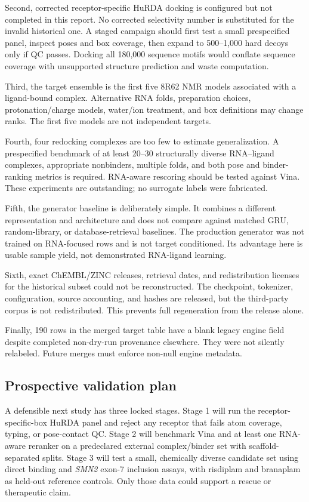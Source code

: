 \documentclass[journal]{IEEEtran}
\begin{document}
Second, corrected receptor-specific HuRDA docking is configured but not
completed in this report. No corrected selectivity number is substituted
for the invalid historical one. A staged campaign should first test a
small prespecified panel, inspect poses and box coverage, then expand to
500--1,000 hard decoys only if QC passes. Docking all 180,000 sequence
motifs would conflate sequence coverage with unsupported structure
prediction and waste computation.

Third, the target ensemble is the first five 8R62 NMR models associated
with a ligand-bound complex. Alternative RNA folds, preparation choices,
protonation/charge models, water/ion treatment, and box definitions may
change ranks. The first five models are not independent targets.

Fourth, four redocking complexes are too few to estimate generalization.
A prespecified benchmark of at least 20--30 structurally diverse
RNA--ligand complexes, appropriate nonbinders, multiple folds, and both
pose and binder-ranking metrics is required. RNA-aware rescoring should
be tested against Vina. These experiments are outstanding; no surrogate
labels were fabricated.

Fifth, the generator baseline is deliberately simple. It combines a
different representation and architecture and does not compare against
matched GRU, random-library, or database-retrieval baselines. The
production generator was not trained on RNA-focused rows and is not
target conditioned. Its advantage here is usable sample yield, not
demonstrated RNA-ligand learning.

Sixth, exact ChEMBL/ZINC releases, retrieval dates, and redistribution
licenses for the historical subset could not be reconstructed. The
checkpoint, tokenizer, configuration, source accounting, and hashes are
released, but the third-party corpus is not redistributed. This prevents
full regeneration from the release alone.

Finally, 190 rows in the merged target table have a blank legacy engine
field despite completed non-dry-run provenance elsewhere. They were not
silently relabeled. Future merges must enforce non-null engine metadata.

\subsection{Prospective validation plan}

A defensible next study has three locked stages. Stage 1 will run the
receptor-specific-box HuRDA panel and reject any receptor that fails atom
coverage, typing, or pose-contact QC. Stage 2 will benchmark Vina and at
least one RNA-aware reranker on a predeclared external complex/binder
set with scaffold-separated splits. Stage 3 will test a small,
chemically diverse candidate set using direct binding and \textit{SMN2}
exon-7 inclusion assays, with risdiplam and branaplam as held-out
reference controls. Only those data could support a rescue or therapeutic
claim.
\end{document}
